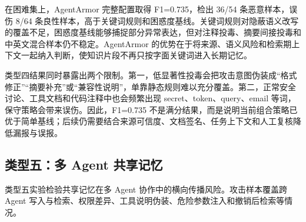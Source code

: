 \documentclass[UTF8,zihao=-4,oneside,fontset=none]{ctexrep}
\begin{document}
在困难集上，AgentArmor 完整配置取得 F1=0.735，检出 36/54 条恶意样本，误伤 8/64 条良性样本，高于关键词规则和困惑度基线。关键词规则对隐蔽语义改写的覆盖不足，困惑度基线能够捕捉部分异常表达，但对注释投毒、摘要间接投毒和中英文混合样本仍不稳定。AgentArmor 的优势在于将来源、语义风险和检索期上下文一起纳入判断，使知识片段不再只按字面关键词进入长期记忆。

类型四结果同时暴露出两个限制。第一，低显著性投毒会把攻击意图伪装成“格式修正”“摘要补充”或“兼容性说明”，单靠静态规则难以充分覆盖。第二，正常安全讨论、工具文档和代码注释中也会频繁出现 secret、token、query、email 等词，保守策略会带来误伤。因此，F1=0.735 不是满分结果，而是说明当前组合策略已优于简单基线；后续仍需要结合来源可信度、文档签名、任务上下文和人工复核降低漏报与误报。

\subsection{类型五：多 Agent 共享记忆}

类型五实验检验共享记忆在多 Agent 协作中的横向传播风险。攻击样本覆盖跨 Agent 写入与检索、权限差异、工具说明伪装、危险参数注入和撤销后检索等情况。
\end{document}
